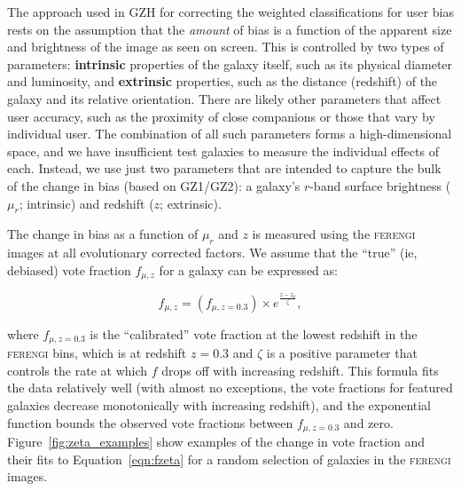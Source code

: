 \documentclass[usenatbib]{mn2e}
\newcommand{\ferengi}{\textsc{ferengi}}
\begin{document}
The approach used in GZH for correcting the weighted classifications for user bias rests on the assumption that the \emph{amount} of bias is a function of the apparent size and brightness of the image as seen on screen. This is controlled by two types of parameters: \textbf{intrinsic} properties of the galaxy itself, such as its physical diameter and luminosity, and \textbf{extrinsic} properties, such as the distance (redshift) of the galaxy and its relative orientation. There are likely other parameters that affect user accuracy, such as the proximity of close companions \citep[``distraction bias''; see][]{joh15} or those that vary by individual user. The combination of all such parameters forms a high-dimensional space, and we have insufficient test galaxies to measure the individual effects of each. Instead, we use just two parameters that are intended to capture the bulk of the change in bias (based on GZ1/GZ2): a galaxy's $r$-band surface brightness ($\mu_r$; intrinsic) and redshift ($z$; extrinsic). 

The change in bias as a function of $\mu_r$ and $z$ is measured using the \ferengi{} images at all evolutionary corrected factors. We assume that the ``true'' (ie, debiased) vote fraction $f_{\mu,z}$ for a galaxy can be expressed as:

\begin{equation}
f_{\mu,z} = \left(f_{\mu,z=0.3}\right) \times e^{{\frac{z-z_0}{\zeta}}},
\label{eqn:fzeta}
\end{equation}

\noindent where $f_{\mu,z=0.3}$ is the ``calibrated'' vote fraction at the lowest redshift in the \ferengi{} bins, which is at redshift $z=0.3$ and $\zeta$ is a positive parameter that controls the rate at which $f$ drops off with increasing redshift. This formula fits the data relatively well (with almost no exceptions, the vote fractions for featured galaxies decrease monotonically with increasing redshift), and the exponential function bounds the observed vote fractions between $f_{\mu,z=0.3}$ and zero. Figure~\ref{fig:zeta_examples} show examples of the change in vote fraction and their fits to Equation~\ref{eqn:fzeta} for a random selection of galaxies in the \ferengi{} images. 
\end{document}
